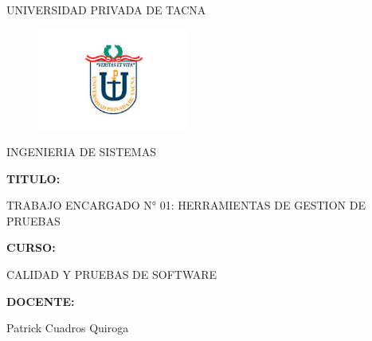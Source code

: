 \documentclass[twoside,twocolumn]{article}
\begin{document}
\begin{titlepage}
\begin{center}
\large{UNIVERSIDAD PRIVADA DE TACNA}\\
\vspace*{-0.025in}
\begin{figure}[htb]
\begin{center}
	\includegraphics[width=5cm]{./imagenes/logo.jpg} 
\end{center}
\end{figure}
\vspace*{0.15in}
INGENIERIA DE SISTEMAS  \\

\vspace*{0.5in}
\begin{large}
\textbf{TITULO:}\\
\end{large}

\vspace*{0.1in}
\begin{Large}
TRABAJO ENCARGADO N° 01: HERRAMIENTAS DE GESTION DE PRUEBAS \\
\end{Large}

\vspace*{0.3in}
\begin{Large}
\textbf{CURSO:} \\
\end{Large}

\vspace*{0.1in}
\begin{large}
CALIDAD Y PRUEBAS DE SOFTWARE\\
\end{large}

\vspace*{0.3in}
\begin{Large}
\textbf{DOCENTE:} \\
\end{Large}

\vspace*{0.1in}
\begin{large}
 Patrick Cuadros Quiroga\\
\end{large}


\end{center}
\end{titlepage}
\end{document}
